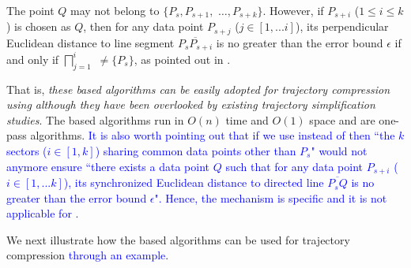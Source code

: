 The point $Q$ may not belong to $\{P_{s}, P_{s+1},$ $\ldots, P_{s+k}\}$.
However, if $P_{s+i}$ ($1\le i\le k$) is chosen as $Q$, then
for any data point $P_{s+j}$ ($j \in [1, ... i]$), its perpendicular Euclidean distance to
line segment $\overline{P_sP_{s+i}}$ is no greater than the error bound $\epsilon$ if and only if $\bigsqcap_{j=1}^{i}$ $\ne \{P_s\}$, as pointed out in \cite{Zhao:Sleeve}.

That is, {\em these \cia based algorithms can be easily adopted for trajectory compression using \ped although they have been overlooked by existing trajectory simplification studies}.  
The \cia based algorithms run in $O(n)$ time and $O(1)$ space and are one-pass algorithms.
%
\textcolor{blue}{It is also worth pointing out that if we use \sed instead of \ped then  ``the $k$ sectors  ($i\in[1,k]$) sharing common data points other than $P_s$" would not anymore ensure ``there exists a data point $Q$ such that for any data point $P_{s+i}$ ($i \in [1, ... k]$), its synchronized Euclidean distance to directed line $\overline{P_sQ}$ is no greater than the error bound $\epsilon$". 
Hence, the \cia mechanism is \ped specific and it is not applicable for \sed.}
 

We next illustrate how the \cia based algorithms can be used for trajectory compression \textcolor{blue}{through an example}.



